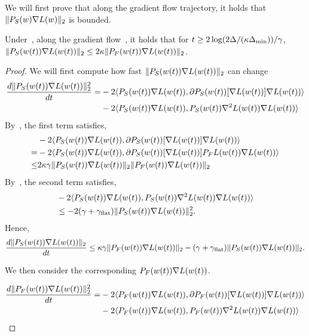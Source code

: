 We will first prove that along the gradient flow trajectory, it holds that $\| {P}_S(w) \nabla L(w)\|_2$ is bounded. 

\begin{lemma}
\label{lem:gfsg}
    Under~, along the gradient flow~, it holds that for $t \ge {2\log(2 \Delta/ (\kappa\Delta_{\min})) }/{\gamma}$, $\| {P}_S(w(t)) \nabla L(w(t))\|_2 \le 2 \kappa \| {P}_F(w(t)) \nabla L(w(t))\|_2$.
\end{lemma}
\begin{proof}
    We will first compute how fast $\| {P}_S(w(t)) \nabla L(w(t)) \|_2$ can change
    \begin{align*}
        \frac{d \|{P}_S(w(t)) \nabla L(w(t))\|_2^2}{dt} =& -2 \langle {P}_S(w(t)) \nabla L(w(t)), \partial {P}_S(w(t))[\nabla L(w(t))] \nabla L(w(t)) \rangle \\ &-2 \langle {P}_S(w(t)) \nabla L(w(t)), {P}_S(w(t)) \nabla^2 L(w(t)) \nabla L(w(t))\rangle \\
    \end{align*}
    By~, the first term satisfies,
    \begin{align*}
        &-2\langle {P}_S(w(t)) \nabla L(w(t)), \partial {P}_S(w(t))[\nabla L(w(t))] \nabla L(w(t)) \rangle \\
        =& -2\langle {P}_S(w(t)) \nabla L(w(t)), \partial {P}_S(w(t))[\nabla L(w(t))] {P}_F L(w(t)) \nabla L(w(t)) \rangle \\
        \le& 2 \kappa \gamma \|{P}_S(w(t)) \nabla L(w(t))\|_2 \|{P}_F(w(t)) \nabla L(w(t))\|_2
    \end{align*}
    By~, the second term satisfies,
    \begin{align*}
        &-2 \langle {P}_S(w(t)) \nabla L(w(t)), {P}_S(w(t)) \nabla^2 L(w(t)) \nabla L(w(t))\rangle \\
        &\le -2(\gamma + \gamma_{\mathrm{flat}}) \| {P}_S(w(t)) \nabla L(w(t))\|_2^2.
    \end{align*}
    Hence,
    \begin{align}
    \label{eq:sgf}
        \frac{d \|{P}_S(w(t)) \nabla L(w(t))\|_2}{dt} \le \kappa \gamma \|{P}_F(w(t)) \nabla L(w(t))\|_2 - (\gamma + \gamma_{\mathrm{flat}}) \|{P}_S(w(t)) \nabla L(w(t))\|_2.
    \end{align}

    We then consider the corresponding ${P}_F(w(t)) \nabla L(w(t))$.

    \begin{align*}
 \frac{d \|{P}_F(w(t)) \nabla L(w(t))\|_2^2}{dt} =& -2 \langle {P}_F(w(t)) \nabla L(w(t)), \partial {P}_F(w(t))[\nabla L(w(t))] \nabla L(w(t)) \rangle \\ &-2 \langle {P}_F(w(t)) \nabla L(w(t)), {P}_F(w(t)) \nabla^2 L(w(t)) \nabla L(w(t))\rangle \\
    \end{align*}


\end{proof}
